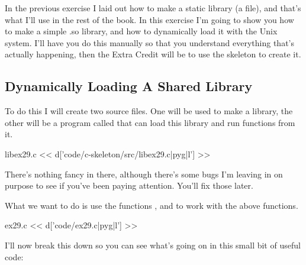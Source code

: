 In the previous exercise I laid out how to make a static library (a  file),
and that's what I'll use in the rest of the book.  In this exercise I'm going to 
show you how to make a simple .so library, and how to dynamically load it with the
Unix  system.  I'll have you do this manually so that you understand
everything that's actually happening, then the Extra Credit will be to use the
 skeleton to create it.

\subsection{Dynamically Loading A Shared Library}

To do this I will create two source files.  One will be used to make a 
 library, the other will be a program called 
that can load this library and run functions from it.

\begin{code}{libex29.c}
<< d['code/c-skeleton/src/libex29.c|pyg|l'] >>
\end{code}

There's nothing fancy in there, although there's some bugs I'm leaving in
on purpose to see if you've been paying attention.  You'll fix those later.

What we want to do is use the functions ,  and
 to work with the above functions.

\begin{code}{ex29.c}
<< d['code/ex29.c|pyg|l'] >>
\end{code}

I'll now break this down so you can see what's going on in this small bit
of useful code:

